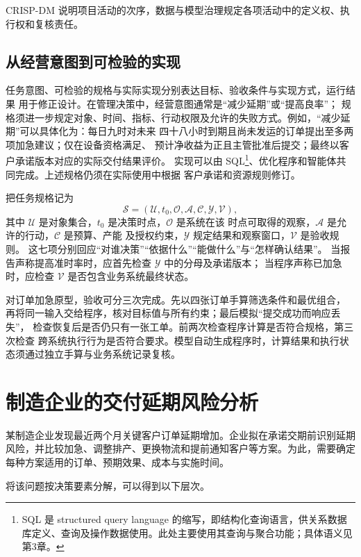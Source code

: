 CRISP-DM 说明项目活动的次序，数据与模型治理规定各项活动中的定义权、执行权和复核责任。

\subsection{从经营意图到可检验的实现}
任务意图、可检验的规格与实际实现分别表达目标、验收条件与实现方式，运行结果
用于修正设计\cite{gse2026}。在管理决策中，经营意图通常是“减少延期”或“提高良率”；
规格须进一步规定对象、时间、指标、行动权限及允许的失败方式。例如，“减少延期”可以具体化为：每日九时对未来
四十八小时到期且尚未发运的订单提出至多两项加急建议；仅在设备资格满足、
预计净收益为正且主管批准后提交；最终以客户承诺版本对应的实际交付结果评价。
实现可以由 SQL\footnote{SQL 是 structured query language 的缩写，即结构化查询语言，供关系数据库定义、查询及操作数据使用。此处主要使用其查询与聚合功能；具体语义见第3章。}、优化程序和智能体共同完成。上述规格仍须在实际使用中根据
客户承诺和资源规则修订。

把任务规格记为
\[
  \mathcal S=(\mathcal U,t_0,\mathcal O,\mathcal A,
    \mathcal C,\mathcal Y,\mathcal V),
\]
其中 \(\mathcal U\) 是对象集合，\(t_0\) 是决策时点，\(\mathcal O\) 是系统在该
时点可取得的观察，\(\mathcal A\) 是允许的行动，\(\mathcal C\) 是预算、产能
及授权约束，\(\mathcal Y\) 规定结果和观察窗口，\(\mathcal V\) 是验收规则。
这七项分别回应“对谁决策”“依据什么”“能做什么”与“怎样确认结果”。
当报告声称提高准时率时，应首先检查 \(\mathcal Y\) 中的分母及承诺版本；
当程序声称已加急时，应检查 \(\mathcal V\) 是否包含业务系统最终状态。

对订单加急原型，验收可分三次完成。先以四张订单手算筛选条件和最优组合，
再将同一输入交给程序，核对目标值与所有约束；最后模拟“提交成功而响应丢失”，
检查恢复后是否仍只有一张工单。前两次检查程序计算是否符合规格，第三次检查
跨系统执行行为是否符合要求。模型自动生成程序时，计算结果和执行状态须通过独立手算与业务系统记录复核。

\section{制造企业的交付延期风险分析}

某制造企业发现最近两个月关键客户订单延期增加。企业拟在承诺交期前识别延期风险，并比较加急、调整排产、更换物流和提前通知客户等方案。为此，需要确定每种方案适用的订单、预期效果、成本与实施时间。

将该问题按决策要素分解，可以得到以下层次。

